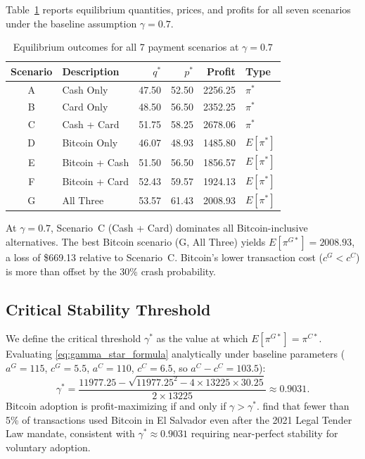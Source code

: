 \documentclass{article}
\begin{document}
Table~\ref{tab:equilibrium_baseline} reports equilibrium quantities, prices,
and profits for all seven scenarios under the baseline assumption $\gamma = 0.7$.

\begin{table}[h]
\centering
\caption{Equilibrium outcomes for all 7 payment scenarios at $\gamma = 0.7$}
\label{tab:equilibrium_baseline}
\begin{tabular}{clrrrl}
\toprule
Scenario & Description & $q^*$ & $p^*$ & Profit & Type \\
\midrule
A & Cash Only              & 47.50 & 52.50 & 2256.25 & $\pi^*$ \\
B & Card Only              & 48.50 & 56.50 & 2352.25 & $\pi^*$ \\
C & Cash + Card            & 51.75 & 58.25 & 2678.06 & $\pi^*$ \\
D & Bitcoin Only           & 46.07 & 48.93 & 1485.80 & $E[\pi^*]$ \\
E & Bitcoin + Cash         & 51.50 & 56.50 & 1856.57 & $E[\pi^*]$ \\
F & Bitcoin + Card         & 52.43 & 59.57 & 1924.13 & $E[\pi^*]$ \\
G & All Three              & 53.57 & 61.43 & 2008.93 & $E[\pi^*]$ \\
\bottomrule
\end{tabular}
\end{table}

At $\gamma = 0.7$, Scenario~C (Cash + Card) dominates all Bitcoin-inclusive
alternatives.
The best Bitcoin scenario (G, All Three) yields $E[\pi^{G*}] = 2008.93$,
a loss of \$669.13 relative to Scenario~C.
Bitcoin's lower transaction cost ($c^G < c^C$) is more than offset by the
30\% crash probability.

\subsection{Critical Stability Threshold}
\label{sec:threshold}

We define the critical threshold $\gamma^*$ as the value at which
$E[\pi^{G*}] = \pi^{C*}$.
Evaluating \eqref{eq:gamma_star_formula} analytically under baseline parameters
($a^G = 115$, $c^G = 5.5$, $a^C = 110$, $c^C = 6.5$, so $a^C - c^C = 103.5$):
\begin{equation}
  \gamma^* = \frac{11977.25 - \sqrt{11977.25^2 - 4 \times 13225 \times 30.25}}{2 \times 13225}
  \approx 0.9031.
  \label{eq:gamma_star}
\end{equation}
Bitcoin adoption is profit-maximizing if and only if $\gamma > \gamma^*$.
\citet{alvarez2023} find that fewer than 5\% of transactions used Bitcoin in
El Salvador even after the 2021 Legal Tender Law mandate, consistent with
$\gamma^* \approx 0.9031$ requiring near-perfect stability for voluntary adoption.
\end{document}

